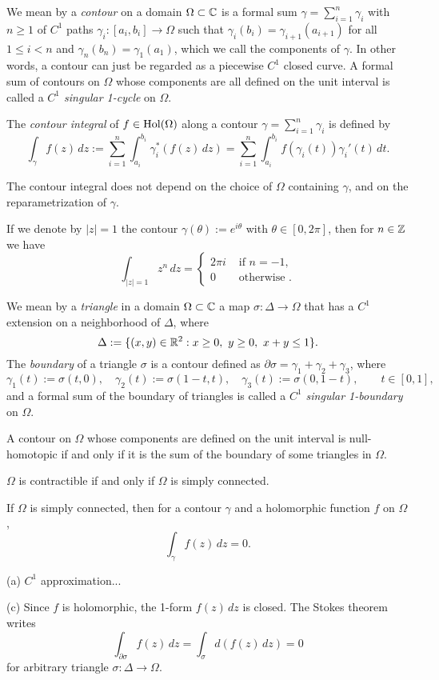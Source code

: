 \documentclass{../../large}
\begin{document}
\begin{prb}
We mean by a \emph{contour} on a domain $\Omega\subset\mathbb{C}$ is a formal sum $\gamma=\sum_{i=1}^n\gamma_i$ with $n\ge1$ of $C^1$ paths $\gamma_i:[a_i,b_i]\to\Omega$ such that $\gamma_i(b_i)=\gamma_{i+1}(a_{i+1})$ for all $1\le i<n$ and $\gamma_n(b_n)=\gamma_1(a_1)$, which we call the components of $\gamma$.
In other words, a contour can just be regarded as a piecewise $C^1$ closed curve.
A formal sum of contours on $\Omega$ whose components are all defined on the unit interval is called a \emph{$C^1$ singular 1-cycle} on $\Omega$.

The \emph{contour integral} of $f\in\operatorname{Hol}(\Omega)$ along a contour $\gamma=\sum_{i=1}^n\gamma_i$ is defined by
\[\int_\gamma f(z)\,dz:=\sum_{i=1}^n\int_{a_i}^{b_i}\gamma_i^*(f(z)\,dz)=\sum_{i=1}^n\int_{a_i}^{b_i}f(\gamma_i(t))\gamma_i'(t)\,dt.\]
\begin{parts}
\item The contour integral does not depend on the choice of $\Omega$ containing $\gamma$, and on the reparametrization of $\gamma$.
\item
If we denote by $|z|=1$ the contour $\gamma(\theta):=e^{i\theta}$ with $\theta\in[0,2\pi]$, then for $n\in\mathbb{Z}$ we have
\[\int_{|z|=1}z^n\,dz=\begin{cases}2\pi i&\text{ if }n=-1,\\0&\text{ otherwise }.\end{cases}\]
\end{parts}
\end{prb}

\begin{prb}
We mean by a \emph{triangle} in a domain $\Omega\subset\mathbb{C}$ a map $\sigma:\Delta\to\Omega$ that has a $C^1$ extension on a neighborhood of $\Delta$, where
\[\Delta:=\{(x,y)\in\R^2:x\ge0,\ y\ge0,\ x+y\le1\}.\]
The \emph{boundary} of a triangle $\sigma$ is a contour defined as $\partial\sigma=\gamma_1+\gamma_2+\gamma_3$, where
\[\gamma_1(t):=\sigma(t,0),\quad\gamma_2(t):=\sigma(1-t,t),\quad\gamma_3(t):=\sigma(0,1-t),\qquad t\in[0,1],\]
and a formal sum of the boundary of triangles is called a \emph{$C^1$ singular 1-boundary} on $\Omega$.
\begin{parts}
\item A contour on $\Omega$ whose components are defined on the unit interval is null-homotopic if and only if it is the sum of the boundary of some triangles in $\Omega$.
\item $\Omega$ is contractible if and only if $\Omega$ is simply connected.
\item If $\Omega$ is simply connected, then for a contour $\gamma$ and a holomorphic function $f$ on $\Omega$,
\[\int_\gamma f(z)\,dz=0.\]
\end{parts}
\end{prb}
\begin{pf}
(a)
$C^1$ approximation...

(c)
Since $f$ is holomorphic, the 1-form $f(z)\,dz$ is closed.
The Stokes theorem writes
\[\int_{\partial\sigma}f(z)\,dz=\int_\sigma d(f(z)\,dz)=0\]
for arbitrary triangle $\sigma:\Delta\to\Omega$.
\end{pf}
\end{document}
